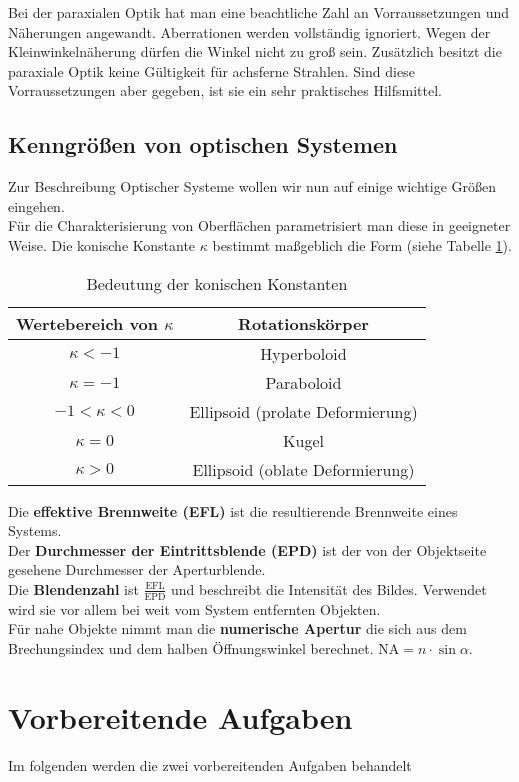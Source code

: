 \documentclass[twoside,colorback,accentcolor=tud4c,11pt]{tudreport}
\begin{document}
		Bei der paraxialen Optik hat man eine beachtliche Zahl an Vorraussetzungen und Näherungen angewandt. Aberrationen werden vollständig ignoriert. Wegen der Kleinwinkelnäherung dürfen die Winkel nicht zu groß sein. Zusätzlich besitzt die paraxiale Optik keine Gültigkeit für achsferne Strahlen. Sind diese Vorraussetzungen aber gegeben, ist sie ein sehr praktisches Hilfsmittel.
\section{Kenngrößen von optischen Systemen}
Zur Beschreibung Optischer Systeme wollen wir nun auf einige wichtige Größen eingehen. \\
Für die Charakterisierung von Oberflächen parametrisiert man diese in geeigneter Weise. Die konische Konstante $ \kappa $ bestimmt maßgeblich die Form (siehe Tabelle \ref{tab:kappa}).
\begin{table}[H]
\centering
\begin{tabular}{|c|c|}
\hline 
Wertebereich von $ \kappa $ & Rotationskörper \\ 
\hline 
$ \kappa <-1 $ & Hyperboloid \\  
$ \kappa =-1 $ & Paraboloid \\ 
$-1< \kappa <0 $ & Ellipsoid (prolate Deformierung) \\ 
$ \kappa =0 $ & Kugel \\ 
$ \kappa >0 $ & Ellipsoid (oblate Deformierung) \\ 
\hline 
\end{tabular} 
\caption{Bedeutung der konischen Konstanten \cite{anl}}\label{tab:kappa}
\end{table}
Die \textbf{effektive Brennweite (EFL)} ist die resultierende Brennweite eines Systems. \\
Der \textbf{Durchmesser der Eintrittsblende (EPD)} ist der von der Objektseite gesehene Durchmesser der Aperturblende. \\
Die \textbf{Blendenzahl} ist $ \frac{\text{EFL}}{\text{EPD}} $ und beschreibt die Intensität des Bildes. Verwendet wird sie vor allem bei weit vom System entfernten Objekten. \\
Für nahe Objekte nimmt man die \textbf{numerische Apertur} die sich aus dem Brechungsindex und dem halben Öffnungswinkel berechnet. NA$ =n\cdot\sin\alpha $.\\
\chapter{Vorbereitende Aufgaben}
Im folgenden werden die zwei vorbereitenden Aufgaben behandelt
\end{document}
